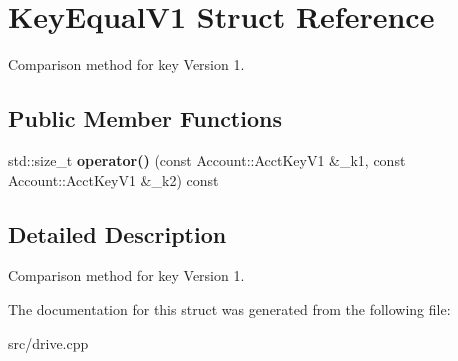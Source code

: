 \hypertarget{structKeyEqualV1}{}\section{Key\+Equal\+V1 Struct Reference}
\label{structKeyEqualV1}


Comparison method for key Version 1.  


\subsection*{Public Member Functions}
\begin{DoxyCompactItemize}
\item 
std\+::size\+\_\+t {\bfseries operator()} (const Account\+::\+Acct\+Key\+V1 \&\+\_\+k1, const Account\+::\+Acct\+Key\+V1 \&\+\_\+k2) const \hypertarget{structKeyEqualV1_ab3618a973353a7519acee13d90f684f3}{}\label{structKeyEqualV1_ab3618a973353a7519acee13d90f684f3}

\end{DoxyCompactItemize}


\subsection{Detailed Description}
Comparison method for key Version 1. 

The documentation for this struct was generated from the following file\+:\begin{DoxyCompactItemize}
\item 
src/drive.\+cpp\end{DoxyCompactItemize}
